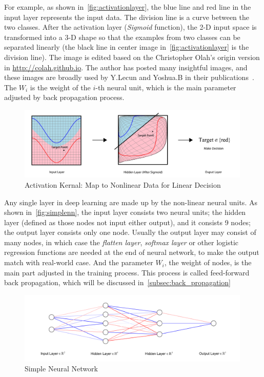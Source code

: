 \begin{spacing}{1.5}
For example, as shown in~\autoref{fig:activationlayer}, the blue line and red line in the input layer represents the input data. The division line is a curve between the two classes. After the activation layer (\textit{Sigmoid} function), the 2-D input space is transformed into a 3-D shape so that the examples from two classes can be separated linearly (the black line in center image in~\autoref{fig:activationlayer} is the division line). The image is edited based on the Christopher Olah's origin version in  \href{http://colah.github.io/posts/2014-03-NN-Manifolds-Topology/}{http://colah.github.io}. The author has posted many insightful images, and these images are broadly used by Y.Lecun and Yoshua.B in their publications~\cite{bengio2017deep, lecun2015deep}. The $W_i$ is the weight of the $i$-th neural unit, which is the main parameter adjusted by back propagation process.


\begin{figure}[th]
\centering
\includegraphics[width=0.99\textwidth, fbox]{Chapter2/activation.pdf}
\caption{Activation Kernal: Map to Nonlinear Data for Linear Decision~\cite{olah2014neural}}
\label{fig:activationlayer} 
\end{figure}

Any single layer in deep learning are made up by the non-linear neural units. As shown in~\autoref{fig:simplenn}, the input layer consists two neural units; the hidden layer (defined as those nodes not input either output), and it consists 9 nodes; the output layer consists only one node. Usually the output layer may consist of many nodes, in which case the \textit{flatten layer}, \textit{softmax layer} or other logistic regression functions are needed at the end of neural network, to make the output match with real-world case. And the parameter $W_i$, the weight of nodes, is the main part adjusted in the training process. This process is called feed-forward back propagation, which will be discussed in~\autoref{subsec:back_propagation}

\begin{figure}[th]
\centering
\includegraphics[width=0.99\textwidth, fbox]{Chapter2/simplenn.pdf}
\caption{Simple Neural Network}
\label{fig:simplenn} 
\end{figure}


\end{spacing}
